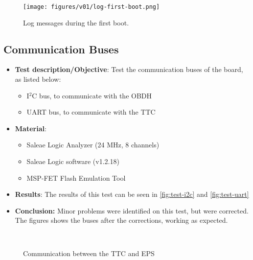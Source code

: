 \begin{figure}[!ht]
    \begin{center}
        \texttt{[image: figures/v01/log-first-boot.png]}
        \caption{Log messages during the first boot.}
        \label{fig:log-first-boot}
    \end{center}
\end{figure}

\subsection{Communication Buses}

\begin{itemize}
    \item \textbf{Test description/Objective}: Test the communication buses of the board, as listed below:
        \begin{itemize}
            \item I$^{2}$C bus, to communicate with the OBDH
            \item UART bus, to communicate with the TTC
        \end{itemize}
    \item \textbf{Material}:
        \begin{itemize}
            \item Saleae Logic Analyzer (24 MHz, 8 channels)
            \item Saleae Logic software (v1.2.18)
            \item MSP-FET Flash Emulation Tool
        \end{itemize}
    \item \textbf{Results}: The results of this test can be seen in \autoref{fig:test-i2c} and \autoref{fig:test-uart}
    \item \textbf{Conclusion:} Minor problems were identified on this test, but were corrected. The figures shows the buses after the corrections, working as expected.
\end{itemize}

\begin{figure}[!htb]
    \begin{center}
        ~
        \caption{Communication between the TTC and EPS}
        \label{fig:test-uart}
    \end{center}
\end{figure}

